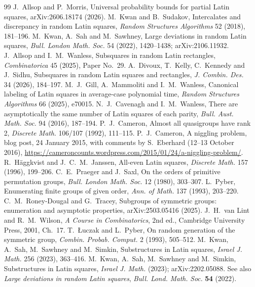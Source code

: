 \documentclass[11pt]{article}
\theoremstyle{definition}
\begin{document}
\begin{thebibliography}{99}
 J.~Allsop and P.~Morris, Universal probability bounds for partial Latin squares, arXiv:2606.18174 (2026).
 M.~Kwan and B.~Sudakov, Intercalates and discrepancy in random Latin squares, \emph{Random Structures Algorithms} 52 (2018), 181--196.
 M.~Kwan, A.~Sah and M.~Sawhney, Large deviations in random Latin squares, \emph{Bull. London Math. Soc.} 54 (2022), 1420--1438; arXiv:2106.11932.
 J.~Allsop and I.~M.~Wanless, Subsquares in random Latin rectangles, \emph{Combinatorica} 45 (2025), Paper No.~29.
 A.~Divoux, T.~Kelly, C.~Kennedy and J.~Sidhu, Subsquares in random Latin squares and rectangles, \emph{J. Combin. Des.} 34 (2026), 184--197.
 M.~J.~Gill, A.~Mammoliti and I.~M.~Wanless, Canonical labeling of Latin squares in average-case polynomial time, \emph{Random Structures Algorithms} 66 (2025), e70015.
 N.~J.~Cavenagh and I.~M.~Wanless, There are asymptotically the same number of Latin squares of each parity, \emph{Bull. Aust. Math. Soc.} 94 (2016), 187--194.
 P.~J.~Cameron, Almost all quasigroups have rank 2, \emph{Discrete Math.} 106/107 (1992), 111--115.
 P.~J.~Cameron, A niggling problem, blog post, 24 January 2015, with comments by S.~Eberhard (12--13 October 2016), \url{https://cameroncounts.wordpress.com/2015/01/24/a-niggling-problem/}.
 R.~H\"aggkvist and J.~C.~M.~Janssen, All-even Latin squares, \emph{Discrete Math.} 157 (1996), 199--206.
 C.~E.~Praeger and J.~Saxl, On the orders of primitive permutation groups, \emph{Bull. London Math. Soc.} 12 (1980), 303--307.
 L.~Pyber, Enumerating finite groups of given order, \emph{Ann. of Math.} 137 (1993), 203--220.
 C.~M.~Roney-Dougal and G.~Tracey, Subgroups of symmetric groups: enumeration and asymptotic properties, arXiv:2503.05416 (2025).
 J.~H.~van Lint and R.~M.~Wilson, \emph{A Course in Combinatorics}, 2nd ed., Cambridge University Press, 2001, Ch.~17.
 T.~{\L}uczak and L.~Pyber, On random generation of the symmetric group, \emph{Combin. Probab. Comput.} 2 (1993), 505--512.
 M.~Kwan, A.~Sah, M.~Sawhney and M.~Simkin, Substructures in Latin squares, \emph{Israel J. Math.} 256 (2023), 363--416.
 M.~Kwan, A.~Sah, M.~Sawhney and M.~Simkin, Substructures in
Latin squares, \emph{Israel J. Math.} (2023); arXiv:2202.05088.  See also
\emph{Large deviations in random Latin squares}, \emph{Bull. Lond. Math.
Soc.} \textbf{54} (2022).


\end{thebibliography}
\end{document}
